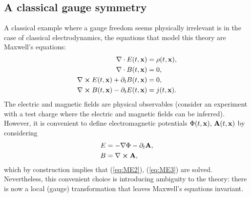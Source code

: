 \documentclass[a4paper]{report}
\begin{document}
\begin{spacing}{1.1}




\subsection{A classical gauge symmetry}

A classical example where a gauge freedom seems physically irrelevant is in the case of classical electrodynamics, the equations that model this theory are Maxwell's equations:
\begin{align}
    \nabla \cdot E(t,\vb{x}) &= \rho(t,\vb{x}), \\
    \nabla \cdot B(t,\vb{x}) &= 0, \label{eq:ME2} \\
    \nabla \cross E(t,\vb{x}) + \partial_{t} B(t,\vb{x}) &= 0, \label{eq:ME3}\\
    \nabla \cross B(t,\vb{x}) - \partial_{t} E(t,\vb{x}) &= j(t,\vb{x}).
\end{align}
The electric and magnetic fields are physical observables (consider an experiment with a test charge where the electric and magnetic fields can be inferred). However, it is convenient to define electromagnetic potentials $\Phi(t,\vb{x}), \, \vb{A}(t,\vb{x})$ by considering
\begin{align}
    E &= - \nabla \Phi - \partial_t \vb{A}, \label{eq:Egauge}\\
    B &= \nabla \cross \vb{A},\label{eq:Mgauge}
\end{align}
which by construction implies that (\ref{eq:ME2}), (\ref{eq:ME3}) are solved. Nevertheless, this convenient choice is introducing ambiguity to the theory: there is now a local (gauge) transformation that leaves Maxwell's equations invariant.


\end{spacing}
\end{document}
